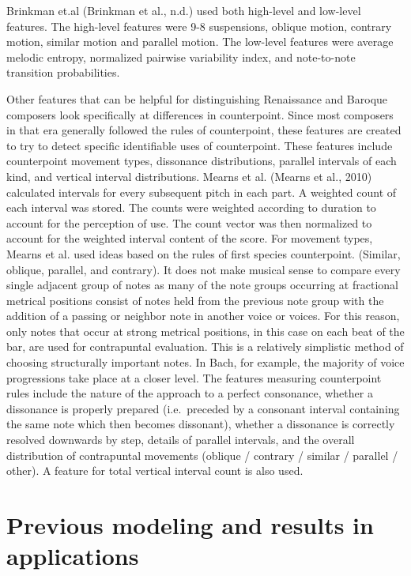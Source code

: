 \documentclass[12pt,twoside]{reedthesis}
\theoremstyle{definition}
\theoremstyle{definition}
\theoremstyle{definition}
\theoremstyle{remark}
\begin{document}
Brinkman et.al (Brinkman et al., n.d.) used both high-level and
low-level features. The high-level features were 9-8 suspensions,
oblique motion, contrary motion, similar motion and parallel motion. The
low-level features were average melodic entropy, normalized pairwise
variability index, and note-to-note transition probabilities.

Other features that can be helpful for distinguishing Renaissance and
Baroque composers look specifically at differences in counterpoint.
Since most composers in that era generally followed the rules of
counterpoint, these features are created to try to detect specific
identifiable uses of counterpoint. These features include counterpoint
movement types, dissonance distributions, parallel intervals of each
kind, and vertical interval distributions. Mearns et al. (Mearns et al.,
2010) calculated intervals for every subsequent pitch in each part. A
weighted count of each interval was stored. The counts were weighted
according to duration to account for the perception of use. The count
vector was then normalized to account for the weighted interval content
of the score. For movement types, Mearns et al. used ideas based on the
rules of first species counterpoint. (Similar, oblique, parallel, and
contrary). It does not make musical sense to compare every single
adjacent group of notes as many of the note groups occurring at
fractional metrical positions consist of notes held from the previous
note group with the addition of a passing or neighbor note in another
voice or voices. For this reason, only notes that occur at strong
metrical positions, in this case on each beat of the bar, are used for
contrapuntal evaluation. This is a relatively simplistic method of
choosing structurally important notes. In Bach, for example, the
majority of voice progressions take place at a closer level. The
features measuring counterpoint rules include the nature of the approach
to a perfect consonance, whether a dissonance is properly prepared
(i.e.~preceded by a consonant interval containing the same note which
then becomes dissonant), whether a dissonance is correctly resolved
downwards by step, details of parallel intervals, and the overall
distribution of contrapuntal movements (oblique / contrary / similar /
parallel / other). A feature for total vertical interval count is also
used.

\section{Previous modeling and results in
applications}\label{previous-modeling-and-results-in-applications}
\end{document}
